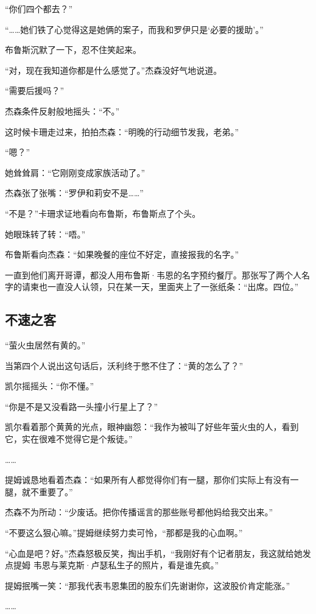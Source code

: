 \documentclass[../main]{subfiles}
\begin{document}
“你们四个都去？”

“……她们铁了心觉得这是她俩的案子，而我和罗伊只是‘必要的援助’。”

布鲁斯沉默了一下，忍不住笑起来。

“对，现在我知道你都是什么感觉了。”杰森没好气地说道。

“需要后援吗？”

杰森条件反射般地摇头：“不。”

这时候卡珊走过来，拍拍杰森：“明晚的行动细节发我，老弟。”

“嗯？”

她耸耸肩：“它刚刚变成家族活动了。”

杰森张了张嘴：“罗伊和莉安不是……”

“不是？”卡珊求证地看向布鲁斯，布鲁斯点了个头。

她眼珠转了转：“唔。”

布鲁斯看向杰森：“如果晚餐的座位不好定，直接报我的名字。”

一直到他们离开哥谭，都没人用布鲁斯·韦恩的名字预约餐厅。那张写了两个人名字的请柬也一直没人认领，只在某一天，里面夹上了一张纸条：“出席。四位。”


\subsection{不速之客}

“萤火虫居然有黄的。”

当第四个人说出这句话后，沃利终于憋不住了：“黄的怎么了？”

凯尔摇摇头：“你不懂。”

“你是不是又没看路一头撞小行星上了？”

凯尔看着那个黄黄的光点，眼神幽怨：“我作为被叫了好些年萤火虫的人，看到它，实在很难不觉得它是个叛徒。”

……

提姆诚恳地看着杰森：“如果所有人都觉得你们有一腿，那你们实际上有没有一腿，就不重要了。”

杰森不为所动：“少废话。把你传播谣言的那些账号都他妈给我交出来。”

“不要这么狠心嘛。”提姆继续努力卖可怜，“那都是我的心血啊。”

“心血是吧？好。”杰森怒极反笑，掏出手机，“我刚好有个记者朋友，我这就给她发点提姆
韦恩与莱克斯·卢瑟私生子的照片，看是谁先疯。”

提姆抿嘴一笑：“那我代表韦恩集团的股东们先谢谢你，这波股价肯定能涨。”

……
\end{document}
